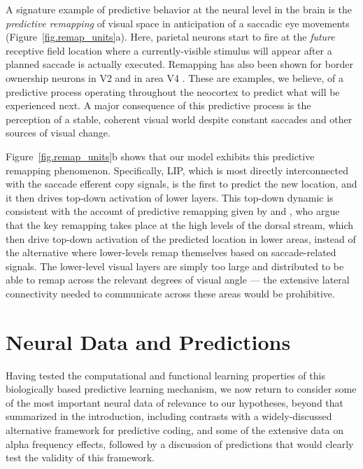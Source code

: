 \documentclass[11pt,twoside]{article}
\newif\myifpdf
\begin{document}
A signature example of predictive behavior at the neural level in the brain is the \emph{predictive remapping} of visual space in anticipation of a saccadic eye movements \citep{DuhamelColbyGoldberg92,ColbyDuhamelGoldberg97,GottliebKusunokiGoldberg98,NakamuraColby02,MarinoMazer16} (Figure~\ref{fig.remap_units}a).  Here, parietal neurons start to fire at the \emph{future} receptive field location where a currently-visible stimulus will appear after a planned saccade is actually executed. Remapping has also been shown for border ownership neurons in V2 \citep{OHerronHeydt13} and in area V4 \citep{NeupaneGuittonPack16,NeupaneGuittonPack20}. These are examples, we believe, of a predictive process operating throughout the neocortex to predict what will be experienced next.  A major consequence of this predictive process is the perception of a stable, coherent visual world despite constant saccades and other sources of visual change.

Figure~\ref{fig.remap_units}b shows that our model exhibits this predictive remapping phenomenon.  Specifically, LIP, which is most directly interconnected with the saccade efferent copy signals, is the first to predict the new location, and it then drives top-down activation of lower layers.  This top-down dynamic is consistent with the account of predictive remapping given by \citet{Wurtz08} and \citet{CavanaghHuntAfrazEtAl10}, who argue that the key remapping takes place at the high levels of the dorsal stream, which then drive top-down activation of the predicted location in lower areas, instead of the alternative where lower-levels remap themselves based on saccade-related signals.  The lower-level visual layers are simply too large and distributed to be able to remap across the relevant degrees of visual angle --- the extensive lateral connectivity needed to communicate across these areas would be prohibitive.

\section{Neural Data and Predictions}

Having tested the computational and functional learning properties of this biologically based predictive learning mechanism, we now return to consider some of the most important neural data of relevance to our hypotheses, beyond that summarized in the introduction, including contrasts with a widely-discussed alternative framework for predictive coding, and some of the extensive data on alpha frequency effects, followed by a discussion of predictions that would clearly test the validity of this framework.
\end{document}
